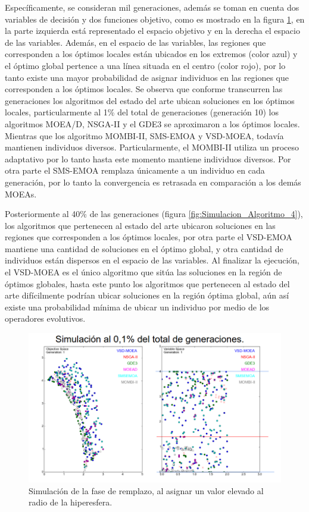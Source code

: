 Específicamente, se consideran mil generaciones, además se toman en cuenta dos variables de decisión y dos funciones objetivo, como es mostrado en la figura \ref{fig:Simulacion_Algoritmo_1}, en la parte izquierda está representado el espacio objetivo y en la derecha el espacio de las variables.
%
Además, en el espacio de las variables, las regiones que corresponden a los óptimos locales están ubicados en los extremos (color azul) y el óptimo global pertence a una línea situada en el centro (color rojo), por lo tanto existe una mayor probabilidad de asignar individuos en las regiones que corresponden a los óptimos locales.
%
Se observa que conforme transcurren las generaciones los algoritmos del estado del arte ubican soluciones en los óptimos locales, particularmente al 1\% del total de generaciones (generación 10) los algoritmos MOEA/D, NSGA-II y el GDE3 se aproximaron a los óptimos locales.
%
Mientras que los algoritmo MOMBI-II, SMS-EMOA y VSD-MOEA, todavía mantienen individuos diversos.
%
Particularmente, el MOMBI-II utiliza un proceso adaptativo por lo tanto hasta este momento mantiene individuos diversos.
%
Por otra parte el SMS-EMOA remplaza únicamente a un individuo en cada generación, por lo tanto la convergencia es retrasada en comparación a los demás MOEAs. 
%

Posteriormente al 40\% de las generaciones (figura \ref{fig:Simulacion_Algoritmo_4}), los algoritmos que pertenecen al estado del arte ubicaron soluciones en las regiones que corresponden a los óptimos locales, por otra parte el VSD-EMOA mantiene una cantidad de soluciones en el óptimo global, y otra cantidad de individuos están dispersos en el espacio de las variables.
%
Al finalizar la ejecución, el VSD-MOEA es el único algoritmo que sitúa las soluciones en la región de óptimos globales, hasta este punto los algoritmos que pertenecen al estado del arte difícilmente podrían ubicar soluciones en la región óptima global, aún así existe una probabilidad mínima de ubicar un individuo por medio de los operadores evolutivos.

\begin{figure}[H]
\centering
\scriptsize
\includegraphics[scale=0.35]
{Figures_Chapter3/Simulacion_Algoritmo_1.png}
\decoRule
\caption{Simulación de la fase de remplazo, al asignar un valor elevado al radio de la hiperesfera.}
\label{fig:Simulacion_Algoritmo_1}
\end{figure}


